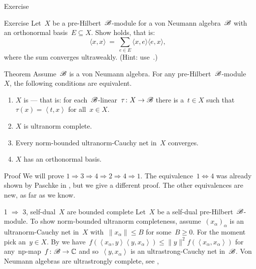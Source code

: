 \documentclass[b]{subfiles}
\begin{document}
\begin{parsec}
\begin{point}{Exercise}
\end{point}
\begin{point}{Exercise}
Let~$X$ be a pre-Hilbert~$\mathscr{B}$-module for a von Neumann algebra~$\mathscr{B}$
    with an orthonormal basis~$E \subseteq X$.
    Show  holds, that is:
\begin{equation*}
    \langle x, x \rangle \ =\ 
    \sum_{e \in E} \langle x, e\rangle \langle e, x\rangle,
\end{equation*}
where the sum converges ultraweakly.
(Hint: use~.)
\end{point}
\begin{point}[dils-selfdual]{Theorem}%
    Assume~$\mathscr{B}$ is a von Neumann algebra.
    For any pre-Hilbert~$\mathscr{B}$-module~$X$,
        the following conditions are equivalent.
        \begin{enumerate}
            \item $X$ is  ---
                that is: for each~$\mathscr{B}$-linear~$\tau\colon X \to \mathscr{B}$
                there is a~$t \in X$ such that~$\tau(x) = \left<t,x\right>$
                    for all~$x \in X$.
            \item $X$ is ultranorm complete.
            \item Every norm-bounded ultranorm-Cauchy net in~$X$ converges.
            \item $X$ has an orthonormal basis.
        \end{enumerate}
\begin{point}{Proof}%
We will prove $1 \Rightarrow 3 \Rightarrow 4 \Rightarrow 2 \Rightarrow 4 \Rightarrow 1$.
The equivalence~$1 \Leftrightarrow 4$
    was already shown by Paschke in \cite[Thm.~3.12]{paschke},
    but we give a different proof. The other equivalences are new,
    as far as we know.
\begin{point}{1 $\Rightarrow$ 3, self-dual~$X$ are bounded complete}%
    Let~$X$ be a self-dual pre-Hilbert~$\mathscr{B}$-module.
    To show norm-bounded ultranorm completeness,
     assume~$(x_\alpha)_\alpha$ is an ultranorm-Cauchy net in~$X$
        with~$\|x_\alpha\| \leq B$ for some~$B \geq 0$.
     For the moment pick an~$y \in X$.
By  we
    have~$f(\left<x_\alpha,y\right>\left<y,x_\alpha\right>) \leq \|y\|^2
        f(\left<x_\alpha,x_\alpha\right>)$ for any~np-map~$f\colon \mathscr{B} \to \mathbb{C}$
        and so~$\left<y,x_\alpha\right>$ is an ultrastrong-Cauchy net in~$\mathscr{B}$.
Von Neumann algebras are ultrastrongly complete, see \sref{vn-complete},

\end{point}
\end{point}
\end{point}
\end{parsec}
\end{document}
